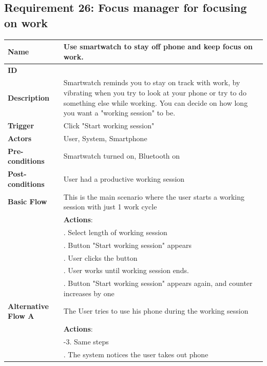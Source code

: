 \documentclass{article}
\begin{document}
	\subsection{Requirement 26: Focus manager for focusing on work}
	\vspace{1em}
	\begin{center}
		\small
		\begin{tabularx}{1.0\textwidth}{|>{\raggedright\arraybackslash}p{}|>{\raggedright\arraybackslash}X|}
			\hline
			\textbf{Name}               & Use smartwatch to stay off phone and keep focus on work. \\\hline
			\textbf{ID}                 & 26 \\\hline
			\textbf{Description}        & Smartwatch reminds you to stay on track with work, by vibrating when you try to look at your phone or try to do something else while working. You can decide on how long you want a "working session" to be. \\\hline
			\textbf{Trigger}            & Click "Start working session" \\\hline
			\textbf{Actors}             & User, System, Smartphone \\\hline
			\textbf{Pre-conditions}     & Smartwatch turned on, Bluetooth on \\\hline
			\textbf{Post-conditions}    & User had a productive working session \\\hline
			\textbf{Basic Flow} 		& This is the main scenario where the user starts a working session with just 1 work cycle \\\hline
										& \textbf{Actions}: \\
										& 1. Select length of working session\\
										& 2. Button "Start working session" appears \\
										& 3. User clicks the button \\
										& 4. User works until working session ends. \\
										& 5. Button "Start working session" appears again, and counter increases by one \\
			\textbf{Alternative Flow A} & The User tries to use his phone during the working session \\\hline
										& \textbf{Actions}: \\
										& 1-3. Same steps \\
										& 4. The system notices the user takes out phone \\

\end{tabularx}
\end{center}
\end{document}
